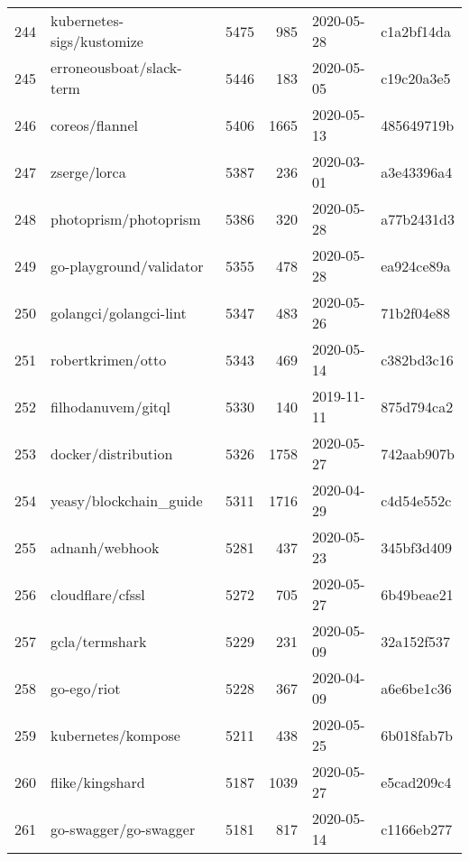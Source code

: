 \begin{longtable}{llrrll}
    244 &                          kubernetes-sigs/kustomize &   5475 &    985 & 2020-05-28 &  c1a2bf14da \\
    245 &                           erroneousboat/slack-term &   5446 &    183 & 2020-05-05 &  c19c20a3e5 \\
    246 &                                     coreos/flannel &   5406 &   1665 & 2020-05-13 &  485649719b \\
    247 &                                       zserge/lorca &   5387 &    236 & 2020-03-01 &  a3e43396a4 \\
    248 &                              photoprism/photoprism &   5386 &    320 & 2020-05-28 &  a77b2431d3 \\
    249 &                            go-playground/validator &   5355 &    478 & 2020-05-28 &  ea924ce89a \\
    250 &                             golangci/golangci-lint &   5347 &    483 & 2020-05-26 &  71b2f04e88 \\
    251 &                                  robertkrimen/otto &   5343 &    469 & 2020-05-14 &  c382bd3c16 \\
    252 &                                 filhodanuvem/gitql &   5330 &    140 & 2019-11-11 &  875d794ca2 \\
    253 &                                docker/distribution &   5326 &   1758 & 2020-05-27 &  742aab907b \\
    254 &                             yeasy/blockchain\_guide &   5311 &   1716 & 2020-04-29 &  c4d54e552c \\
    255 &                                     adnanh/webhook &   5281 &    437 & 2020-05-23 &  345bf3d409 \\
    256 &                                   cloudflare/cfssl &   5272 &    705 & 2020-05-27 &  6b49beae21 \\
    257 &                                     gcla/termshark &   5229 &    231 & 2020-05-09 &  32a152f537 \\
    258 &                                        go-ego/riot &   5228 &    367 & 2020-04-09 &  a6e6be1c36 \\
    259 &                                 kubernetes/kompose &   5211 &    438 & 2020-05-25 &  6b018fab7b \\
    260 &                                    flike/kingshard &   5187 &   1039 & 2020-05-27 &  e5cad209c4 \\
    261 &                              go-swagger/go-swagger &   5181 &    817 & 2020-05-14 &  c1166eb277 \\

\end{longtable}
